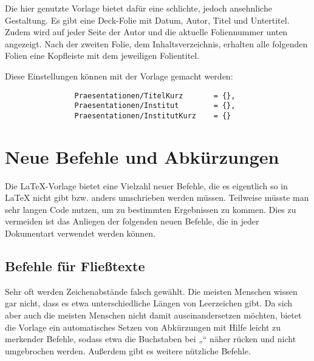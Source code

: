 				Die hier genutzte Vorlage bietet dafür eine schlichte, jedoch ansehnliche Gestaltung. Es gibt eine Deck-Folie mit Datum, Autor, Titel und Untertitel. Zudem wird auf jeder Seite der Autor und die aktuelle Foliennummer unten angezeigt. Nach der zweiten Folie, dem Inhaltsverzeichnis, erhalten alle folgenden Folien eine Kopfleiste mit dem jeweiligen Folientitel. 
				
				Diese Einstellungen können mit der Vorlage gemacht werden: 
				
				\begin{verbatim}
				Praesentationen/TitelKurz       = {},
				Praesentationen/Institut        = {},
				Praesentationen/InstitutKurz    = {}
				\end{verbatim}
				
		\section{Neue Befehle und Abkürzungen}
		
			Die \LaTeX{}-Vorlage bietet eine Vielzahl neuer Befehle, die es eigentlich so in \LaTeX{} nicht gibt bzw. anders umschrieben werden müssen. Teilweise müsste man sehr langen Code nutzen, um zu bestimmten Ergebnissen zu kommen. Dies zu vermeiden ist das Anliegen der folgenden neuen Befehle, die in jeder Dokumentart verwendet werden können. 
			
			\subsection{Befehle für Fließtexte}
			
				Sehr oft werden Zeichenabstände falsch gewählt. Die meisten Menschen wissen gar nicht, dass es etwa unterschiedliche Längen von Leerzeichen gibt. Da sich aber auch die meisten Menschen nicht damit auseinandersetzen möchten, bietet die Vorlage ein automatisches Setzen von Abkürzungen mit Hilfe leicht zu merkender Befehle, sodass etwa die Buchstaben bei „\zb“ näher rücken und nicht umgebrochen werden. Außerdem gibt es weitere nützliche Befehle.\newline
				
